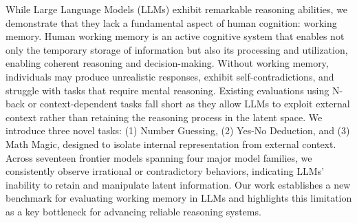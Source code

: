 While Large Language Models (LLMs) exhibit remarkable reasoning abilities, we demonstrate that they lack a fundamental aspect of human cognition: working memory. Human working memory is an active cognitive system that enables not only the temporary storage of information but also its processing and utilization, enabling coherent reasoning and decision-making. Without working memory, individuals may produce unrealistic responses, exhibit self-contradictions, and struggle with tasks that require mental reasoning. Existing evaluations using N-back or context-dependent tasks fall short as they allow LLMs to exploit external context rather than retaining the reasoning process in the latent space. We introduce three novel tasks: (1) Number Guessing, (2) Yes-No Deduction, and (3) Math Magic, designed to isolate internal representation from external context. Across seventeen frontier models spanning four major model families, we consistently observe irrational or contradictory behaviors, indicating LLMs' inability to retain and manipulate latent information. Our work establishes a new benchmark for evaluating working memory in LLMs and highlights this limitation as a key bottleneck for advancing reliable reasoning systems.